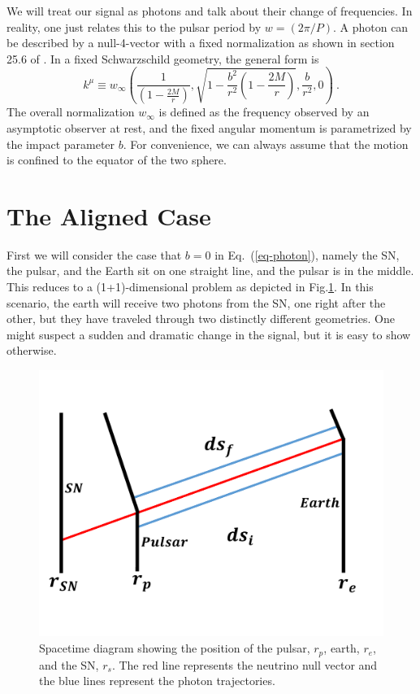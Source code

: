 \documentclass[aps,showpacs,onecolumn,floats,prd,superscriptaddress,nofootinbib]{revtex4}
\begin{document}
We will treat our signal as photons and talk about their change of frequencies. In reality, one just relates this to the pulsar period by $w=(2\pi/P)$. A photon can be described by a null-4-vector with a fixed normalization as shown in section 25.6 of \cite{MTW}. In a fixed Schwarzschild geometry, the general form is
\begin{equation}
	k^\mu \equiv w_{\infty}\left( \frac{1}{(1- \frac{2M}{r})}, \sqrt{ 1 - \frac{b^2}{r^2} \left( 1 - \frac{2M}{r} \right)}, \frac{b}{r^2}, 0 \right)~. \label{eq-photon}	
\end{equation}
The overall normalization $w_{\infty}$ is defined as the frequency observed by an asymptotic observer at rest, and the fixed angular momentum is parametrized by the impact parameter $b$. For convenience, we can always assume that the motion is confined to the equator of the two sphere.

\section{The Aligned Case}
\label{sec-1+1}

First we will consider the case that $b=0$ in Eq.~(\ref{eq-photon}), namely the SN, the pulsar, and the Earth sit on one straight line, and the pulsar is in the middle. This reduces to a (1+1)-dimensional problem as depicted in Fig.\ref{fig:1}. In this scenario, the earth will receive two photons from the SN, one right after the other, but they have traveled through two distinctly different geometries. One might suspect a sudden and dramatic change in the signal, but it is easy to show otherwise.

\begin{figure}[tb!]
\begin{center}
\includegraphics[scale = 0.3]{Image2.pdf}
\caption{Spacetime diagram showing the position of the pulsar, $r_p$, earth, $r_e$, and the SN, $r_s$. The red line represents the neutrino null vector and the blue lines represent the photon trajectories.}
\label{fig:1}
\end{center}
\end{figure}
\end{document}
